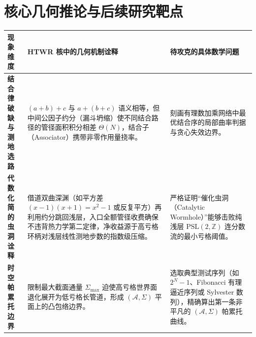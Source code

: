 \documentclass[11pt,a4paper]{ctexart}
\theoremstyle{plain}
\theoremstyle{definition}
\newcommand{\ZZ}{\mathbb{Z}}
\newcommand{\cA}{\mathcal{A}}
\newcommand{\PSL}{\mathrm{PSL}}
\begin{document}
\clearpage
\section{核心几何推论与后续研究靶点}

\begin{center}
\footnotesize
\renewcommand{\arraystretch}{1.45}
\setlength{\tabcolsep}{4pt}
\begin{tabularx}{\textwidth}{@{}>{\raggedright\arraybackslash}p{3.0cm}
  >{\raggedright\arraybackslash}X
  >{\raggedright\arraybackslash}p{4.4cm}@{}}
\toprule
\textbf{现象维度} & \textbf{HTWR 核中的几何机制诠释} & \textbf{待攻克的具体数学问题} \\
\midrule
\textbf{结合律破缺与测地选路}
& $(a+b)+c$ 与 $a+(b+c)$ 语义相等，但中间公因子约分（漏斗坍缩）使不同结合路径的管径面积积分相差 $\Theta(N)$，结合子（Associator）携带非零作用量挠率。
& 刻画有理数加乘网络中最优结合序的局部曲率判据与贪心失效边界。 \\
\addlinespace
\textbf{代数化简的虫洞诠释}
& 借道双曲深渊（如平方差 $(x-1)(x+1) = x^2 - 1$ 或反复平方）再利用约分跳回浅层，入口全额管径收费确保不违背热力学第二定律，净收益源于高亏格环柄对浅层线性测地步数的指数级压缩。
& 严格证明“催化虫洞（Catalytic Wormhole）”能够击败纯浅层 $\PSL(2, \ZZ)$ 连分数流的最小亏格阈值。 \\
\addlinespace
\textbf{时空帕累托边界}
& 限制最大截面通量 $\Sigma_{\max}$ 迫使高亏格世界面退化展开为低亏格长管道，形成 $(\cA, \Sigma)$ 平面上的凸包络边界。
& 选取典型测试序列（如 $2^N - 1$、Fibonacci 有理逼近序列或 Sylvester 数列），精确算出第一条非平凡的 $(\cA, \Sigma)$ 帕累托曲线。 \\
\bottomrule
\end{tabularx}
\label{tab:outlook}
\end{center}
\end{document}
